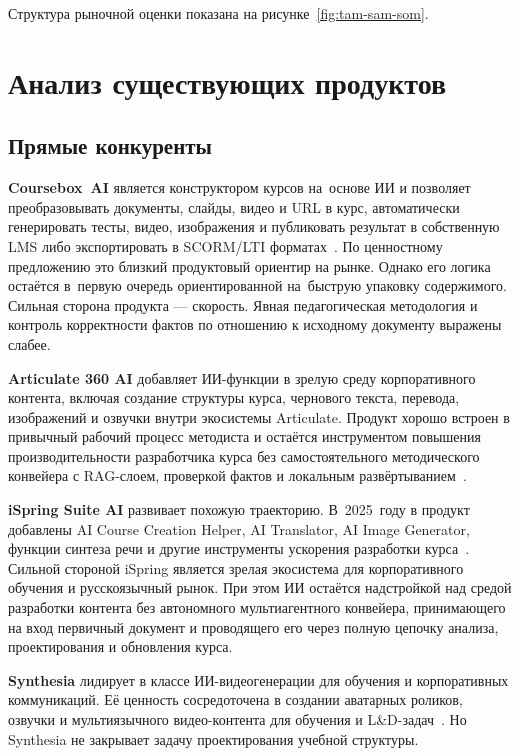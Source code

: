 Структура рыночной оценки показана на рисунке~\ref{fig:tam-sam-som}.



\section{Анализ существующих продуктов}

\subsection{Прямые конкуренты}

\textbf{Coursebox~AI} является конструктором курсов на~основе ИИ и
позволяет преобразовывать документы, слайды, видео и URL в курс,
автоматически генерировать тесты, видео, изображения и публиковать
результат в собственную LMS либо экспортировать в SCORM/LTI
форматах~\cite{coursebox_ai_2024}. По ценностному предложению это
близкий продуктовый ориентир на рынке.
Однако его логика остаётся в~первую очередь ориентированной
на~быструю упаковку содержимого. Сильная сторона продукта — скорость.
Явная педагогическая
методология и контроль корректности фактов по отношению к исходному
документу выражены слабее.

\textbf{Articulate 360 AI} добавляет ИИ-функции в зрелую среду
корпоративного контента, включая создание структуры курса, чернового текста,
перевода, изображений и озвучки внутри экосистемы Articulate.
Продукт хорошо встроен в привычный рабочий процесс методиста
и остаётся инструментом повышения производительности разработчика курса
без самостоятельного методического конвейера с RAG-слоем,
проверкой фактов и локальным развёртыванием~\cite{articulate_ai_2025}.

\textbf{iSpring Suite AI} развивает похожую траекторию. В~2025~году
в продукт добавлены AI Course Creation Helper,
AI Translator, AI Image Generator, функции синтеза речи и
другие инструменты ускорения разработки курса~\cite{ispring_suite_ai_2026}.
Сильной стороной iSpring является зрелая экосистема для корпоративного
обучения и русскоязычный рынок. При этом ИИ остаётся надстройкой
над средой разработки контента без автономного
мультиагентного конвейера, принимающего на вход первичный документ
и проводящего его через полную цепочку анализа, проектирования и
обновления курса.

\textbf{Synthesia} лидирует в классе ИИ-видеогенерации для обучения
и корпоративных коммуникаций. Её ценность сосредоточена в создании
аватарных роликов, озвучки и мультиязычного видео-контента
для обучения и L\&D-задач~\cite{synthesia_ai_training_2025}.
Но Synthesia не закрывает задачу проектирования учебной структуры.


